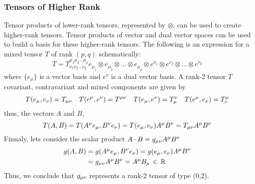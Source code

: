 \subsubsection{Tensors of Higher Rank}
Tensor products of lower-rank tensors, represented by $\otimes$, can be used to create higher-rank tensors. Tensor products of vector and dual vector spaces can be used to build a basis for these higher-rank tensors. The following is an expression for a mixed tensor $T$ of rank $(p,q)$ schematically:
\begin{equation}
T=T^{\mu_1\mu_2...\mu_p}_{\nu_1\nu_2...\nu_q}e_{\mu_1}\otimes e_{\mu_2} \otimes ... \otimes e_{\mu_p} \otimes e^{\nu_1}\otimes e^{\nu_2} \otimes ... \otimes e^{\nu_p}
\end{equation}
where $\{e_\mu\}$ is a vector basis and ${e^\nu}$ is a dual vector basis. A rank-2 tensor $T$ covariant, contravariant and mixed components are given by
\begin{align}
T(e_\mu,e_\nu)=T_{\mu\nu} && T(e^\mu,e^\nu)=T^{\mu\nu} && T(e_\mu,e^\nu)=T_\mu^\nu && T(e^\mu,e_\nu)=T^\mu_\nu 
\end{align}
thus, the vectors $A$ and $B$,
\begin{equation}
T(A,B)=T(A^\mu e_\mu,B^\nu e_\nu)=T(e_\mu,e_\nu)A^\mu B^\nu=T_{\mu\nu} A^\mu B^\nu
\end{equation}
Finnaly, lets consider the scalar product $A\cdot B=g_{\mu\nu} A^\mu B^\nu$
\begin{equation}
\begin{aligned}
g(A,B)&=g(A^\mu e_\mu,B^\nu e_\nu)=g(e_\mu,e_\nu)A^\mu B^\nu\\
&=g_{\mu\nu} A^\mu B^\nu=A^\mu B_\mu\, \in \, \mathbb{R}
\end{aligned}
\end{equation}
Thus, we conclude that $g_{\mu\nu}$ represents a rank-2 tensor of type (0,2).
